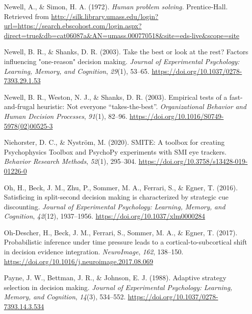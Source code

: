\documentclass[
  english,
  man]{apa6}
\newlength{\cslhangindent}
\newenvironment{cslreferences}%
  {\setlength{\parindent}{0pt}%
  \everypar{\setlength{\hangindent}{\cslhangindent}}\ignorespaces}%
  {\par}
\begin{document}
\begin{cslreferences}
\leavevmode\hypertarget{ref-newellHumanProblemSolving1972}{}%
Newell, A., \& Simon, H. A. (1972). \emph{Human problem solving.} Prentice-Hall. Retrieved from \url{http://silk.library.umass.edu/login?url=https://search.ebscohost.com/login.aspx?direct=true\&db=cat06087a\&AN=umass.000770518\&site=eds-live\&scope=site}

\leavevmode\hypertarget{ref-newellTakeBestLook2003}{}%
Newell, B. R., \& Shanks, D. R. (2003). Take the best or look at the rest? Factors influencing "one-reason" decision making. \emph{Journal of Experimental Psychology: Learning, Memory, and Cognition}, \emph{29}(1), 53--65. \url{https://doi.org/10.1037/0278-7393.29.1.53}

\leavevmode\hypertarget{ref-newellEmpiricalTestsFastandfrugal2003}{}%
Newell, B. R., Weston, N. J., \& Shanks, D. R. (2003). Empirical tests of a fast-and-frugal heuristic: Not everyone ``takes-the-best''. \emph{Organizational Behavior and Human Decision Processes}, \emph{91}(1), 82--96. \url{https://doi.org/10.1016/S0749-5978(02)00525-3}

\leavevmode\hypertarget{ref-niehorster_smite_2020}{}%
Niehorster, D. C., \& Nyström, M. (2020). SMITE: A toolbox for creating Psychophysics Toolbox and PsychoPy experiments with SMI eye trackers. \emph{Behavior Research Methods}, \emph{52}(1), 295--304. \url{https://doi.org/10.3758/s13428-019-01226-0}

\leavevmode\hypertarget{ref-ohSatisficingSplitsecondDecision2016}{}%
Oh, H., Beck, J. M., Zhu, P., Sommer, M. A., Ferrari, S., \& Egner, T. (2016). Satisficing in split-second decision making is characterized by strategic cue discounting. \emph{Journal of Experimental Psychology: Learning, Memory, and Cognition}, \emph{42}(12), 1937--1956. \url{https://doi.org/10.1037/xlm0000284}

\leavevmode\hypertarget{ref-oh-descherProbabilisticInferenceTime2017}{}%
Oh-Descher, H., Beck, J. M., Ferrari, S., Sommer, M. A., \& Egner, T. (2017). Probabilistic inference under time pressure leads to a cortical-to-subcortical shift in decision evidence integration. \emph{NeuroImage}, \emph{162}, 138--150. \url{https://doi.org/10.1016/j.neuroimage.2017.08.069}

\leavevmode\hypertarget{ref-payneAdaptiveStrategySelection1988}{}%
Payne, J. W., Bettman, J. R., \& Johnson, E. J. (1988). Adaptive strategy selection in decision making. \emph{Journal of Experimental Psychology: Learning, Memory, and Cognition}, \emph{14}(3), 534--552. \url{https://doi.org/10.1037/0278-7393.14.3.534}


\end{cslreferences}
\end{document}

